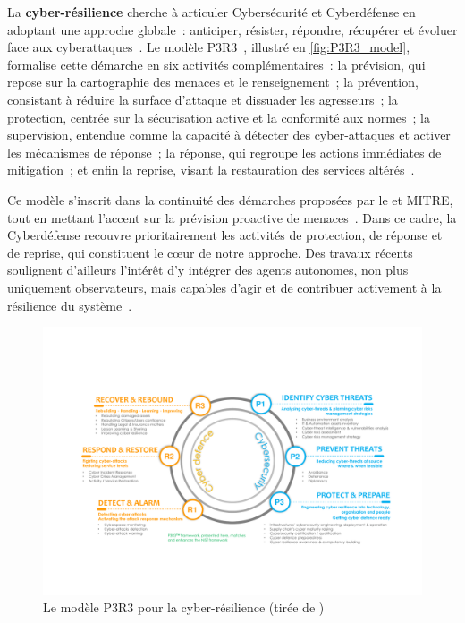 La \textbf{cyber-résilience} cherche à articuler Cybersécurité et Cyberdéfense en adoptant une approche globale~: anticiper, résister, répondre, récupérer et évoluer face aux cyberattaques~\cite{NISTresilience}. Le modèle P3R3~\cite{Theron2013P3R3}, illustré en \autoref{fig:P3R3_model}, formalise cette démarche en six activités complémentaires~: la prévision, qui repose sur la cartographie des menaces et le renseignement~; la prévention, consistant à réduire la surface d'attaque et dissuader les agresseurs~; la protection, centrée sur la sécurisation active et la conformité aux normes~; la supervision, entendue comme la capacité à détecter des cyber-attaques et activer les mécanismes de réponse~; la réponse, qui regroupe les actions immédiates de mitigation~; et enfin la reprise, visant la restauration des services altérés~\cite{Theron2013P3R3}.

Ce modèle s'inscrit dans la continuité des démarches proposées par le  et MITRE, tout en mettant l'accent sur la prévision proactive de menaces~\cite{Theron2013P3R3}. Dans ce cadre, la Cyberdéfense recouvre prioritairement les activités de protection, de réponse et de reprise, qui constituent le cœur de notre approche. Des travaux récents soulignent d'ailleurs l'intérêt d'y intégrer des agents autonomes, non plus uniquement observateurs, mais capables d'agir et de contribuer activement à la résilience du système~\cite{Kott2023}.

\begin{figure}[h]
  \centering
  \includegraphics[width=\linewidth]{figures/P3R3.pdf}
  \caption{Le modèle P3R3 pour la cyber-résilience (tirée de \autocite{Kott2023})}
  \label{fig:P3R3_model}
\end{figure}

